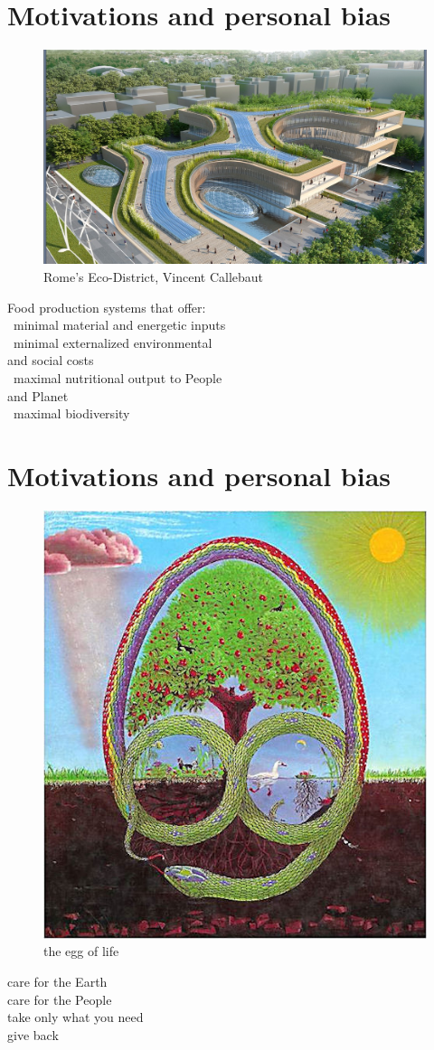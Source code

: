 \documentclass[
paper=128mm:96mm, %
fontsize=11pt, %
pagesize, %
parskip=half-, %
]{scrartcl} %
\theoremstyle{mythmstyle} %
\begin{document}
\section{Motivations and personal bias}
\begin{figure}
\scriptsize 
\centering
\includegraphics[width = 5 cm]{Image5.jpg}
\caption{\scriptsize  Rome's Eco-District, Vincent Callebaut}
\end{figure}
Food production systems that offer:\\
\textasteriskcentered \ minimal material and energetic inputs \\
\textasteriskcentered \ minimal externalized environmental \\
and social costs \\
\textasteriskcentered \ maximal nutritional output to People \\
and Planet\\
\textasteriskcentered \ maximal biodiversity

\clearpage
\section{Motivations and personal bias}
\begin{figure}
\scriptsize 
\centering
\includegraphics[height=3.5 cm]{Image19.jpg}
\caption{the egg of life}
\end{figure}
\textasteriskcentered care for the Earth\\
\textasteriskcentered care for the People \\
\textasteriskcentered take only what you need\\
\textasteriskcentered give back
\end{document}
